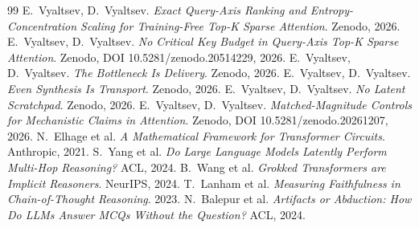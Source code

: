 \documentclass[11pt]{article}
\begin{document}
\begin{thebibliography}{99}
\small
{} E.\ Vyaltsev, D.\ Vyaltsev. \emph{Exact Query-Axis Ranking and Entropy-Concentration Scaling for Training-Free Top-K Sparse Attention}. Zenodo, 2026.
 E.\ Vyaltsev, D.\ Vyaltsev. \emph{No Critical Key Budget in Query-Axis Top-K Sparse Attention}. Zenodo, DOI 10.5281/zenodo.20514229, 2026.
 E.\ Vyaltsev, D.\ Vyaltsev. \emph{The Bottleneck Is Delivery}. Zenodo, 2026.
 E.\ Vyaltsev, D.\ Vyaltsev. \emph{Even Synthesis Is Transport}. Zenodo, 2026.
 E.\ Vyaltsev, D.\ Vyaltsev. \emph{No Latent Scratchpad}. Zenodo, 2026.
 E.\ Vyaltsev, D.\ Vyaltsev. \emph{Matched-Magnitude Controls for Mechanistic Claims in Attention}. Zenodo, DOI 10.5281/zenodo.20261207, 2026.
 N.\ Elhage et al. \emph{A Mathematical Framework for Transformer Circuits}. Anthropic, 2021.
 S.\ Yang et al. \emph{Do Large Language Models Latently Perform Multi-Hop Reasoning?} ACL, 2024.
 B.\ Wang et al. \emph{Grokked Transformers are Implicit Reasoners}. NeurIPS, 2024.
 T.\ Lanham et al. \emph{Measuring Faithfulness in Chain-of-Thought Reasoning}. 2023.
 N.\ Balepur et al. \emph{Artifacts or Abduction: How Do LLMs Answer MCQs Without the Question?} ACL, 2024.
\end{thebibliography}
\end{document}
